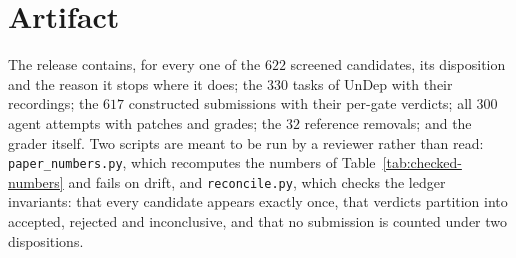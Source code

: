 \section{Artifact}
\label{app:artifact}

The release contains, for every one of the $622$ screened candidates,
its disposition and the reason it stops where it does; the $330$ tasks
of UnDep with their recordings; the $617$ constructed submissions with
their per-gate verdicts; all $300$ agent attempts with patches and
grades; the $32$ reference removals; and the grader itself. Two scripts
are meant to be run by a reviewer rather than read:
\texttt{paper\_numbers.py}, which recomputes the numbers of
Table~\ref{tab:checked-numbers} and fails on drift, and
\texttt{reconcile.py}, which checks the ledger invariants: that every
candidate appears exactly once, that verdicts partition into accepted,
rejected and inconclusive, and that no submission is counted under two
dispositions.
